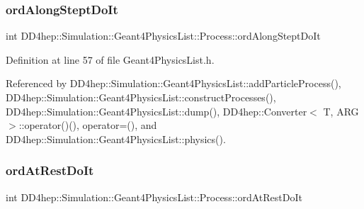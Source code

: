 \hypertarget{class_d_d4hep_1_1_simulation_1_1_geant4_physics_list_1_1_process_a392bb771bc353a55146a63793868fdd9}{}\label{class_d_d4hep_1_1_simulation_1_1_geant4_physics_list_1_1_process_a392bb771bc353a55146a63793868fdd9} 
\subsubsection{\texorpdfstring{ord\+Along\+Stept\+Do\+It}{ordAlongSteptDoIt}}
{\footnotesize\ttfamily int D\+D4hep\+::\+Simulation\+::\+Geant4\+Physics\+List\+::\+Process\+::ord\+Along\+Stept\+Do\+It}



Definition at line 57 of file Geant4\+Physics\+List.\+h.



Referenced by D\+D4hep\+::\+Simulation\+::\+Geant4\+Physics\+List\+::add\+Particle\+Process(), D\+D4hep\+::\+Simulation\+::\+Geant4\+Physics\+List\+::construct\+Processes(), D\+D4hep\+::\+Simulation\+::\+Geant4\+Physics\+List\+::dump(), D\+D4hep\+::\+Converter$<$ T, A\+R\+G $>$\+::operator()(), operator=(), and D\+D4hep\+::\+Simulation\+::\+Geant4\+Physics\+List\+::physics().

\hypertarget{class_d_d4hep_1_1_simulation_1_1_geant4_physics_list_1_1_process_ab2954e7c39774a2eefc0891b8b5cf000}{}\label{class_d_d4hep_1_1_simulation_1_1_geant4_physics_list_1_1_process_ab2954e7c39774a2eefc0891b8b5cf000} 
\subsubsection{\texorpdfstring{ord\+At\+Rest\+Do\+It}{ordAtRestDoIt}}
{\footnotesize\ttfamily int D\+D4hep\+::\+Simulation\+::\+Geant4\+Physics\+List\+::\+Process\+::ord\+At\+Rest\+Do\+It}



